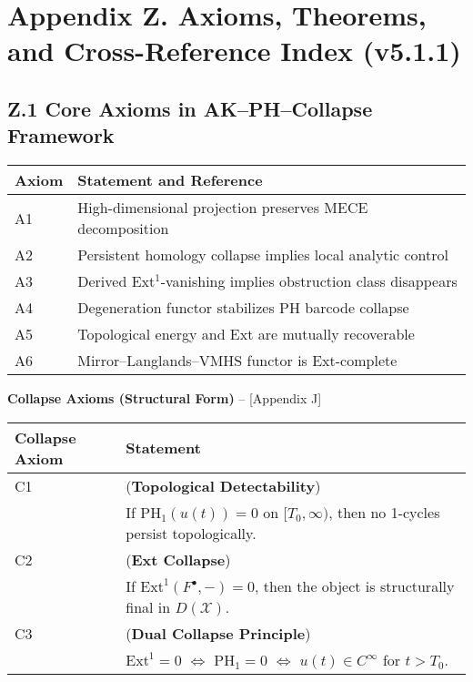 \documentclass[11pt]{article}
\theoremstyle{definition}
\begin{document}



\section*{Appendix Z. Axioms, Theorems, and Cross-Reference Index (v5.1.1)}

\subsection*{Z.1 Core Axioms in AK–PH–Collapse Framework}

\begin{tabular}{ll}
\textbf{Axiom} & \textbf{Statement and Reference} \\
\hline
A1 & High-dimensional projection preserves MECE decomposition \quad [Sec. 2.1] \\
A2 & Persistent homology collapse implies local analytic control \quad [Step 1–3] \\
A3 & Derived Ext$^1$-vanishing implies obstruction class disappears \quad [Appendix G] \\
A4 & Degeneration functor stabilizes PH barcode collapse \quad [Appendix H] \\
A5 & Topological energy and Ext are mutually recoverable \quad [Appendix C, I.X] \\
A6 & Mirror–Langlands–VMHS functor is Ext-complete \quad [Appendix I.13] \\
\end{tabular}

\vspace{1em}

\textbf{Collapse Axioms (Structural Form)} – [Appendix J]

\begin{tabular}{ll}
\textbf{Collapse Axiom} & \textbf{Statement} \\
\hline
C1 & (\textbf{Topological Detectability}) \\
   & If PH$_1(u(t)) = 0$ on $[T_0,\infty)$, then no 1-cycles persist topologically. \\
C2 & (\textbf{Ext Collapse}) \\
   & If $\mathrm{Ext}^1(F^\bullet, -) = 0$, then the object is structurally final in $D(\mathcal{X})$. \\
C3 & (\textbf{Dual Collapse Principle}) \\
   & $\mathrm{Ext}^1 = 0$ $\Leftrightarrow$ $\mathrm{PH}_1 = 0$ $\Leftrightarrow$ $u(t) \in C^\infty$ for $t > T_0$. \\
\end{tabular}
\end{document}
